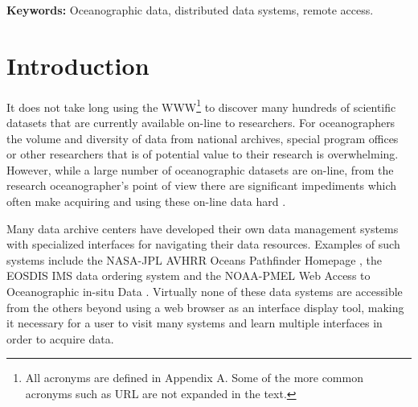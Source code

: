 \documentclass[12pt]{article}
\begin{document}
{\bf Keywords:} Oceanographic data, distributed data systems, remote access.

\tableofcontents

\section{Introduction}

%

It does not take long using the \ac{WWW}\footnote{All acronyms are
defined in Appendix A. Some of the more common acronyms such as URL
are not expanded in the text.} to discover many hundreds of
scientific datasets that are currently available on-line to researchers.  For
oceanographers the volume and diversity of data from national archives,
special program offices or other researchers that is of potential value to
their research is overwhelming. However, while a large number of
oceanographic datasets are on-line, from the research oceanographer's point
of view there are significant impediments which often make acquiring and
using these on-line data hard \cite{muntz:data}.

Many data archive centers have developed their own data management systems
with specialized interfaces for navigating their data resources. Examples of
such systems include the \acs{NASA}-\acs{JPL} \acs{AVHRR} Oceans Pathfinder
Homepage \cite{podaac:sst}, the \acs{EOSDIS} \acs{IMS} data ordering system
\cite{eosdis:ims} and the \acs{NOAA}-\acs{PMEL} Web Access to Oceanographic
in-situ Data \cite{noaapmel:tao}.  Virtually none of these data systems
are accessible from the others beyond using a web browser as an interface
display tool, making it necessary for a user to visit many systems and learn
multiple interfaces in order to acquire data.
\end{document}
